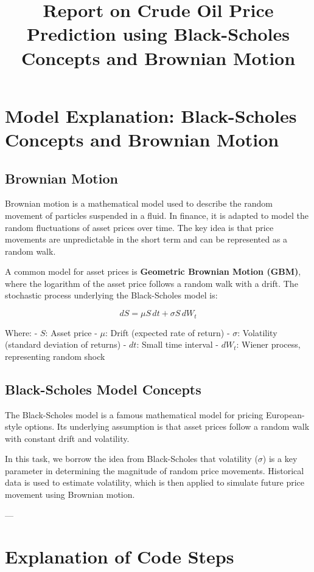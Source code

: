 \documentclass[12pt]{article}
\begin{document}
\title{Report on Crude Oil Price Prediction using Black-Scholes Concepts and Brownian Motion}
\author{}
\date{}
\maketitle

\section{Model Explanation: Black-Scholes Concepts and Brownian Motion}

\subsection{Brownian Motion}
Brownian motion is a mathematical model used to describe the random movement of particles suspended in a fluid.  
In finance, it is adapted to model the random fluctuations of asset prices over time. The key idea is that price movements are unpredictable in the short term and can be represented as a random walk.  

A common model for asset prices is \textbf{Geometric Brownian Motion (GBM)}, where the logarithm of the asset price follows a random walk with a drift. The stochastic process underlying the Black-Scholes model is:

\[
dS = \mu S \, dt + \sigma S \, dW_t
\]

Where:  
- \( S \): Asset price  
- \( \mu \): Drift (expected rate of return)  
- \( \sigma \): Volatility (standard deviation of returns)  
- \( dt \): Small time interval  
- \( dW_t \): Wiener process, representing random shock  

\subsection{Black-Scholes Model Concepts}
The Black-Scholes model is a famous mathematical model for pricing European-style options.  
Its underlying assumption is that asset prices follow a random walk with constant drift and volatility.  

In this task, we borrow the idea from Black-Scholes that volatility (\( \sigma \)) is a key parameter in determining the magnitude of random price movements. Historical data is used to estimate volatility, which is then applied to simulate future price movement using Brownian motion.  

---

\section{Explanation of Code Steps}
\end{document}
